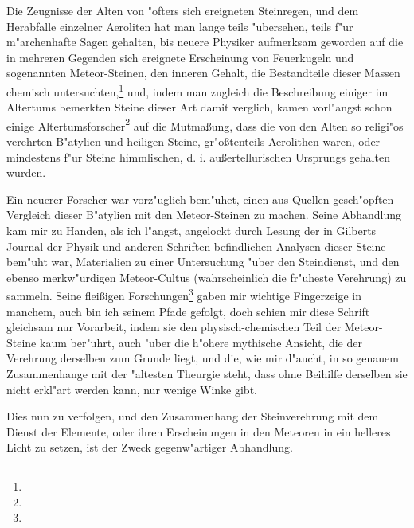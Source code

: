 \documentclass[a4paper, 11pt, oneside, polutonikogreek, german]{article}
\begin{document}
Die Zeugnisse der Alten von "ofters sich ereigneten Steinregen, und dem Herabfalle einzelner Aeroliten hat man lange teils "ubersehen, teils f"ur m"archenhafte Sagen gehalten, bis neuere Physiker aufmerksam geworden auf die in mehreren Gegenden sich ereignete Erscheinung von Feuerkugeln und sogenannten Meteor-Steinen, den inneren Gehalt, die Bestandteile dieser Massen chemisch untersuchten,\footnote{} und, indem man zugleich die Beschreibung einiger im Altertums bemerkten Steine dieser Art damit verglich, kamen vorl"angst schon einige Altertumsforscher\footnote{} auf die Mutmaßung, dass die von den Alten so religi"os verehrten B"atylien und heiligen Steine, gr"oßtenteils Aerolithen waren, oder mindestens f"ur Steine himmlischen, d. i. außertellurischen Ursprungs gehalten wurden.

Ein neuerer Forscher war vorz"uglich bem"uhet, einen aus Quellen gesch"opften Vergleich dieser B"atylien mit den Meteor-Steinen zu machen. Seine Abhandlung kam mir zu Handen, als ich l"angst, angelockt durch Lesung der in Gilberts Journal der Physik und anderen Schriften befindlichen Analysen dieser Steine bem"uht war, Materialien zu einer Untersuchung "uber den Steindienst, und den ebenso merkw"urdigen Meteor-Cultus (wahrscheinlich die fr"uheste Verehrung) zu sammeln. Seine fleißigen Forschungen\footnote{} gaben mir wichtige Fingerzeige in manchem, auch bin ich seinem Pfade gefolgt, doch schien mir diese Schrift gleichsam nur Vorarbeit, indem sie den physisch-chemischen Teil der Meteor-Steine kaum ber"uhrt, auch "uber die h"ohere mythische Ansicht, die der Verehrung derselben zum Grunde liegt, und die, wie mir d"aucht, in so genauem Zusammenhange mit der "altesten Theurgie steht, dass ohne Beihilfe derselben sie nicht erkl"art werden kann, nur wenige Winke gibt.

Dies nun zu verfolgen, und den Zusammenhang der Steinverehrung mit dem Dienst der Elemente, oder ihren Erscheinungen in den Meteoren in ein helleres Licht zu setzen, ist der Zweck gegenw"artiger Abhandlung.
\clearpage
\end{document}
